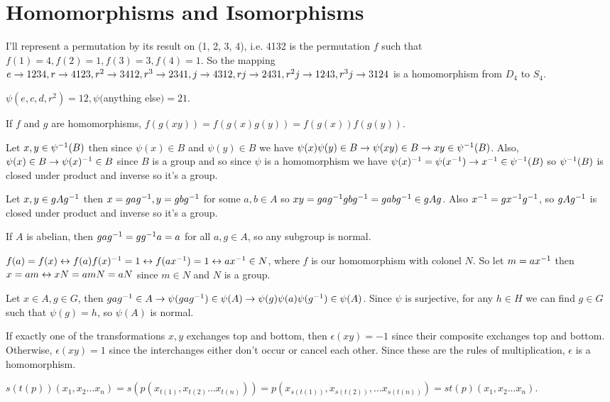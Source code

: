 \documentclass[11pt, oneside]{article}   	%
\begin{document}
\section{Homomorphisms and Isomorphisms}
\be
\item I'll represent a permutation by its result on (1, 2, 3, 4), i.e. 4132 is the permutation $f$ such that $f(1) = 4, f(2) = 1, f(3) = 3, f(4) = 1$. So the mapping $e \rightarrow 1234, r \rightarrow 4123, r^2 \rightarrow 3412, r^3 \rightarrow 2341, j \rightarrow 4312, rj \rightarrow 2431, r^2j \rightarrow 1243, r^3j \rightarrow 3124$ is a homomorphism from $D_4$ to $S_4$.
\item $\psi(e, c, d, r^2) = 12, \psi($anything else$) = 21$.
\item If $f$ and $g$ are homomorphisms, $f(g(xy)) = f(g(x)g(y)) = f(g(x))f(g(y))$.
\item Let $x, y \in \psi^{-1}(B)$ then since $\psi(x) \in B$ and $\psi(y) \in B$ we have $\psi(x)\psi(y) \in B \rightarrow \psi(xy) \in B \rightarrow xy \in \psi^{-1}(B)$. Also, $\psi(x) \in B \rightarrow \psi(x)^{-1} \in B$ since $B$ is a group and so since $\psi$ is a homomorphism we have $\psi(x)^{-1} = \psi(x^{-1}) \rightarrow x^{-1} \in \psi^{-1}(B)$ so $\psi^{-1}(B)$ is closed under product and inverse so it's a group.
\item Let $x, y \in gAg^{-1}$ then $x = gag^{-1}, y=gbg^{-1}$ for some $a, b\in A$ so $xy = gag^{-1} gbg^{-1} = gabg^{-1} \in gAg$. Also $x^{-1} = gx^{-1} g^{-1}$, so $gAg^{-1}$ is closed under product and inverse so it's a group.
\item If $A$ is abelian, then $gag^{-1} = gg^{-1} a = a$ for all $a, g \in A$, so any subgroup is normal.
\item $f(a) = f(x) \leftrightarrow f(a)f(x)^{-1} = 1 \leftrightarrow f(ax^{-1}) = 1 \leftrightarrow ax^{-1} \in N$, where $f$ is our homomorphism with colonel $N$. So let $m = ax^{-1}$ then $x = am \leftrightarrow xN = amN = aN$ since $m \in N$ and $N$ is a group.   
\item Let $x \in A, g \in G$, then $gag^{-1} \in A \rightarrow \psi(gag^{-1}) \in \psi(A) \rightarrow \psi(g)\psi(a)\psi(g^{-1}) \in \psi(A)$. Since $\psi$ is surjective, for any $h \in H$ we can find $g\in G$ such that $\psi(g) = h$, so $\psi(A)$ is normal.
\item If exactly one of the transformations $x, y$ exchanges top and bottom, then $\epsilon(xy) = -1$ since their composite exchanges top and bottom. Otherwise, $\epsilon(xy) = 1$ since the interchanges either don't occur or cancel each other. Since these are the rules of multiplication, $\epsilon$ is a homomorphism.
\item $s(t(p))(x_1, x_2 \ldots x_n) = s(p(x_{t(1)}, x_{t(2)}\ldots x_{t(n)})) = p(x_{s(t(1))}, x_{s(t(2))}, \ldots x_{s(t(n))}) = st(p)(x_1, x_2 \ldots x_n)$. 
\end{document}
